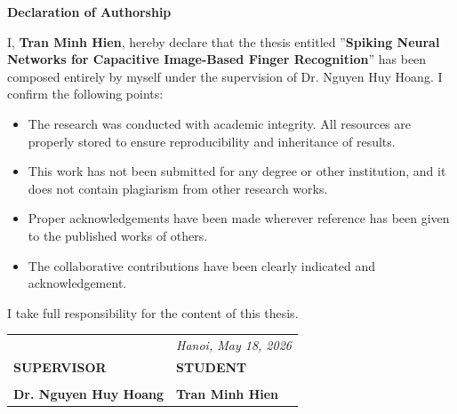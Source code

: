 \documentclass[../main.tex]{subfiles}
\begin{document}
\begin{center}
    \Large{\textbf{Declaration of Authorship}}\\
\end{center}
\vspace{1cm}

I, \textbf{Tran Minh Hien}, hereby declare that the thesis entitled ”\textbf{Spiking Neural Networks for Capacitive Image-Based Finger Recognition}” has been composed entirely by myself under the 
supervision of Dr. Nguyen Huy Hoang. I confirm the following points:

\begin{itemize}
    \item The research was conducted with academic integrity. All resources are properly stored to ensure reproducibility and inheritance of results.
    \item This work has not been submitted for any degree or other institution, and it does not contain plagiarism from other research works.
    \item Proper acknowledgements have been made wherever reference has been given to the published works of others.
    \item The collaborative contributions have been clearly indicated and acknowledgement.
\end{itemize}

I take full responsibility for the content of this thesis.


\begin{center}

\begin{tabular}{p{} p{}}

&
\centering \textit{Hanoi, May 18, 2026}
\tabularnewline

\centering \textbf{SUPERVISOR}
&
\centering \textbf{STUDENT}
\tabularnewline

\\[2cm]

\centering \textbf{Dr. Nguyen Huy Hoang}
&
\centering \textbf{Tran Minh Hien}
\tabularnewline

\end{tabular}
\end{center}
\end{document}
